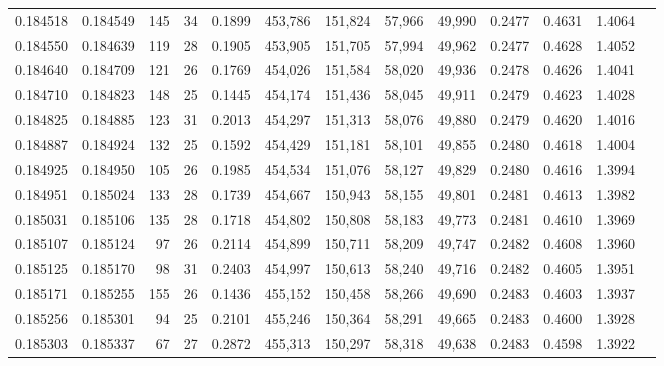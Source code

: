 \begin{tabular}{rrrrrrrrrrrrr}
0.184518 & 0.184549 & 145 &  34 &                                     0.1899 & 453,786 & 151,824 &  57,966 &  49,990 & 0.2477 & 0.4631 & 1.4064 \\
0.184550 & 0.184639 & 119 &  28 &                                     0.1905 & 453,905 & 151,705 &  57,994 &  49,962 & 0.2477 & 0.4628 & 1.4052 \\
0.184640 & 0.184709 & 121 &  26 &                                     0.1769 & 454,026 & 151,584 &  58,020 &  49,936 & 0.2478 & 0.4626 & 1.4041 \\
0.184710 & 0.184823 & 148 &  25 &                                     0.1445 & 454,174 & 151,436 &  58,045 &  49,911 & 0.2479 & 0.4623 & 1.4028 \\
0.184825 & 0.184885 & 123 &  31 &                                     0.2013 & 454,297 & 151,313 &  58,076 &  49,880 & 0.2479 & 0.4620 & 1.4016 \\
0.184887 & 0.184924 & 132 &  25 &                                     0.1592 & 454,429 & 151,181 &  58,101 &  49,855 & 0.2480 & 0.4618 & 1.4004 \\
0.184925 & 0.184950 & 105 &  26 &                                     0.1985 & 454,534 & 151,076 &  58,127 &  49,829 & 0.2480 & 0.4616 & 1.3994 \\
0.184951 & 0.185024 & 133 &  28 &                                     0.1739 & 454,667 & 150,943 &  58,155 &  49,801 & 0.2481 & 0.4613 & 1.3982 \\
0.185031 & 0.185106 & 135 &  28 &                                     0.1718 & 454,802 & 150,808 &  58,183 &  49,773 & 0.2481 & 0.4610 & 1.3969 \\
0.185107 & 0.185124 &  97 &  26 &                                     0.2114 & 454,899 & 150,711 &  58,209 &  49,747 & 0.2482 & 0.4608 & 1.3960 \\
0.185125 & 0.185170 &  98 &  31 &                                     0.2403 & 454,997 & 150,613 &  58,240 &  49,716 & 0.2482 & 0.4605 & 1.3951 \\
0.185171 & 0.185255 & 155 &  26 &                                     0.1436 & 455,152 & 150,458 &  58,266 &  49,690 & 0.2483 & 0.4603 & 1.3937 \\
0.185256 & 0.185301 &  94 &  25 &                                     0.2101 & 455,246 & 150,364 &  58,291 &  49,665 & 0.2483 & 0.4600 & 1.3928 \\
0.185303 & 0.185337 &  67 &  27 &                                     0.2872 & 455,313 & 150,297 &  58,318 &  49,638 & 0.2483 & 0.4598 & 1.3922 \\

\end{tabular}
